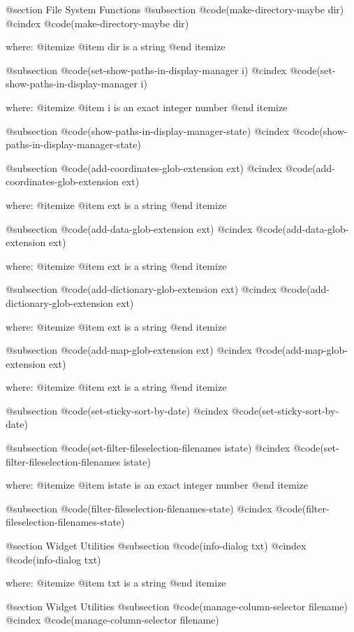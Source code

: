 
@section File System Functions 
@subsection @code{(make-directory-maybe dir)}
@cindex @code{(make-directory-maybe dir)}
 
where: 
 @itemize 
     @item dir is a string
 @end itemize


@subsection @code{(set-show-paths-in-display-manager i)}
@cindex @code{(set-show-paths-in-display-manager i)}
 
where: 
 @itemize 
     @item i is an exact integer number
 @end itemize


@subsection @code{(show-paths-in-display-manager-state)}
@cindex @code{(show-paths-in-display-manager-state)}
 
@subsection @code{(add-coordinates-glob-extension ext)}
@cindex @code{(add-coordinates-glob-extension ext)}
 
where: 
 @itemize 
     @item ext is a string
 @end itemize


@subsection @code{(add-data-glob-extension ext)}
@cindex @code{(add-data-glob-extension ext)}
 
where: 
 @itemize 
     @item ext is a string
 @end itemize


@subsection @code{(add-dictionary-glob-extension ext)}
@cindex @code{(add-dictionary-glob-extension ext)}
 
where: 
 @itemize 
     @item ext is a string
 @end itemize


@subsection @code{(add-map-glob-extension ext)}
@cindex @code{(add-map-glob-extension ext)}
 
where: 
 @itemize 
     @item ext is a string
 @end itemize


@subsection @code{(set-sticky-sort-by-date)}
@cindex @code{(set-sticky-sort-by-date)}
 
@subsection @code{(set-filter-fileselection-filenames istate)}
@cindex @code{(set-filter-fileselection-filenames istate)}
 
where: 
 @itemize 
     @item istate is an exact integer number
 @end itemize


@subsection @code{(filter-fileselection-filenames-state)}
@cindex @code{(filter-fileselection-filenames-state)}
 

@section Widget Utilities 
@subsection @code{(info-dialog txt)}
@cindex @code{(info-dialog txt)}
 
where: 
 @itemize 
     @item txt is a string
 @end itemize



@section Widget Utilities 
@subsection @code{(manage-column-selector filename)}
@cindex @code{(manage-column-selector filename)}
 
